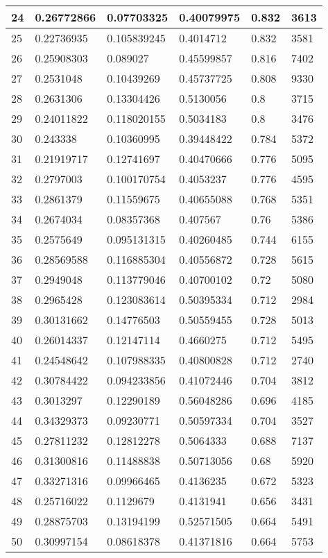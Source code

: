 \begin{longtable}{|l|l|l|l|l|l|}
24 & 0.26772866 & 0.07703325 & 0.40079975 & 0.832 & 3613 \\ \hline 
25 & 0.22736935 & 0.105839245 & 0.4014712 & 0.832 & 3581 \\ \hline 
26 & 0.25908303 & 0.089027 & 0.45599857 & 0.816 & 7402 \\ \hline 
27 & 0.2531048 & 0.10439269 & 0.45737725 & 0.808 & 9330 \\ \hline 
28 & 0.2631306 & 0.13304426 & 0.5130056 & 0.8 & 3715 \\ \hline 
29 & 0.24011822 & 0.118020155 & 0.5034183 & 0.8 & 3476 \\ \hline 
30 & 0.243338 & 0.10360995 & 0.39448422 & 0.784 & 5372 \\ \hline 
31 & 0.21919717 & 0.12741697 & 0.40470666 & 0.776 & 5095 \\ \hline 
32 & 0.2797003 & 0.100170754 & 0.4053237 & 0.776 & 4595 \\ \hline 
33 & 0.2861379 & 0.11559675 & 0.40655088 & 0.768 & 5351 \\ \hline 
34 & 0.2674034 & 0.08357368 & 0.407567 & 0.76 & 5386 \\ \hline 
35 & 0.2575649 & 0.095131315 & 0.40260485 & 0.744 & 6155 \\ \hline 
36 & 0.28569588 & 0.116885304 & 0.40556872 & 0.728 & 5615 \\ \hline 
37 & 0.2949048 & 0.113779046 & 0.40700102 & 0.72 & 5080 \\ \hline 
38 & 0.2965428 & 0.123083614 & 0.50395334 & 0.712 & 2984 \\ \hline 
39 & 0.30131662 & 0.14776503 & 0.50559455 & 0.728 & 5013 \\ \hline 
40 & 0.26014337 & 0.12147114 & 0.4660275 & 0.712 & 5495 \\ \hline 
41 & 0.24548642 & 0.107988335 & 0.40800828 & 0.712 & 2740 \\ \hline 
42 & 0.30784422 & 0.094233856 & 0.41072446 & 0.704 & 3812 \\ \hline 
43 & 0.3013297 & 0.12290189 & 0.56048286 & 0.696 & 4185 \\ \hline 
44 & 0.34329373 & 0.09230771 & 0.50597334 & 0.704 & 3527 \\ \hline 
45 & 0.27811232 & 0.12812278 & 0.5064333 & 0.688 & 7137 \\ \hline 
46 & 0.31300816 & 0.11488838 & 0.50713056 & 0.68 & 5920 \\ \hline 
47 & 0.33271316 & 0.09966465 & 0.4136235 & 0.672 & 5323 \\ \hline 
48 & 0.25716022 & 0.1129679 & 0.4131941 & 0.656 & 3431 \\ \hline 
49 & 0.28875703 & 0.13194199 & 0.52571505 & 0.664 & 5491 \\ \hline 
50 & 0.30997154 & 0.08618378 & 0.41371816 & 0.664 & 5753 \\ \hline 
\end{longtable}